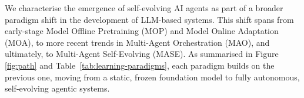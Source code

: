 \documentclass[]{selfevolagent}
\theoremstyle{plain}
\theoremstyle{definition}
\theoremstyle{remark}
\begin{document}
\vspace{1em} We characterise the emergence of self-evolving AI agents as part of a broader paradigm shift in the development of LLM-based systems. This shift spans from early-stage Model Offline Pretraining (MOP) and Model Online Adaptation (MOA), to more recent trends in Multi-Agent Orchestration (MAO), and ultimately, to Multi-Agent Self-Evolving (MASE). As summarised in Figure \ref{fig:path} and Table~\ref{tab:learning-paradigms}, each paradigm builds on the previous one, moving from a static, frozen foundation model to fully autonomous, self-evolving agentic systems. 
\end{document}
